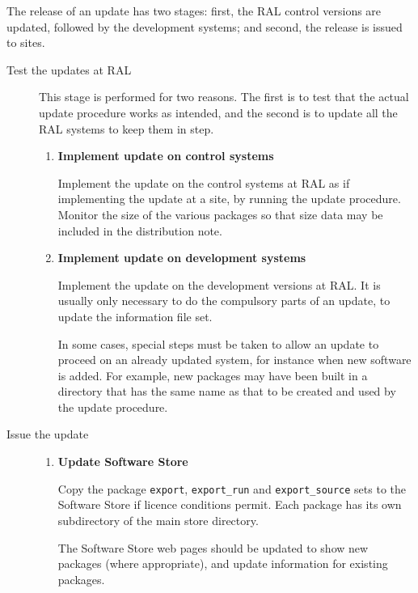\documentclass[twoside,11pt]{article}
\begin{document}
The release of an update has two stages: first, the RAL control
versions are updated, followed by the development systems; and second,
the release is issued to sites.

\begin{description}

\item[Test the updates at RAL]\mbox{}

This stage is performed for two reasons.  The first is to test that the
actual update procedure works as intended, and the second is to update
all the RAL systems to keep them in step.

\begin{enumerate}

\item{\bf{Implement update on control systems}}

Implement the update on the control systems at RAL as if implementing
the update at a site, by running the update procedure.  Monitor the
size of the various packages so that size data may be included in the
distribution note.

\item{\bf{Implement update on development systems}}

Implement the update on the development versions at RAL.  It is usually
only necessary to do the compulsory parts of an update, to update the
information file set.

In some cases, special steps must be taken to allow an update to
proceed on an already updated system, for instance when new software is
added.  For example, new packages may have been built in a directory
that has the same name as that to be created and used by the update
procedure.

\end{enumerate}

\item[Issue the update]\mbox{}

\begin{enumerate}

\item{\bf{Update Software Store}}

Copy the package {\tt{export}}, {\tt{export\_run}} and
{\tt{export\_source}} sets to the Software Store if licence conditions
permit.  Each package has its own subdirectory of the main store
directory.

The Software Store web pages should be updated to show new packages (where
appropriate), and update information for existing packages.


\end{enumerate}
\end{description}
\end{document}
